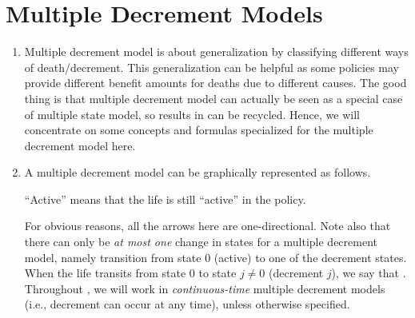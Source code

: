 \section{Multiple Decrement Models}
\label{sect:mult-decr-models}
\begin{enumerate}
\item Multiple decrement model is about generalization by classifying different
ways of death/decrement. This generalization can be helpful as some policies
may provide different benefit amounts for deaths due to different causes. The
good  thing is that multiple decrement model can
actually be seen as a special case of multiple state model, so results in
 can be recycled. Hence, we will concentrate on
some concepts and formulas specialized for the multiple decrement model here.

\item A multiple decrement model can be graphically represented as follows.
\begin{center}
\end{center}
\begin{note}
``Active'' means that the life is still ``active'' in the policy.
\end{note}

For obvious reasons, all the arrows here are one-directional. Note also that
there can only be \emph{at most one} change in states for a multiple decrement
model, namely transition from state \(0\) (active) to one of the decrement
states.  When the life transits from state \(0\) to state \(j\ne 0\) (decrement
\(j\)), we say that .  Throughout
, we will work in \emph{continuous-time} multiple
decrement models (i.e., decrement can occur at any time), unless otherwise
specified.
\end{enumerate}
